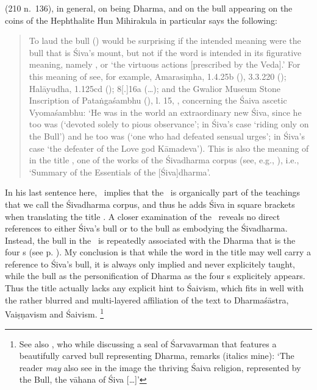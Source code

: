 \documentclass[11pt]{book}
\begin{document}
 (210 n.~136), in general,
on  being Dharma, and
on the bull appearing on the coins of the 
Hephthalite Hun Mihirakula in particular says the following: 

\begin{quote}
{\footnotesize
To laud the bull () 
would be surprising if the intended meaning were 
the bull that is Śiva's mount, but not if the word is intended in its figurative meaning, namely , 
or  `the virtuous actions [prescribed by
the Veda].' For this meaning of  see, for example,
Amarasiṃha,  
1.4.25b (),
3.3.220 (); 
Halāyudha,
 1.125cd (); 
 8[.]16a
(\dots); 
and the Gwalior Museum Stone
Inscription of Pataṅgaśambhu (), l. 15,
, 
concerning the Śaiva ascetic Vyomaśambhu: 
`He was in the
world an extraordinary new Śiva, since he too was 
(`devoted solely to pious observance'; 
in Śiva's case `riding only on the Bull') and he too was 
 (`one who had defeated sensual
urges'; in Śiva's case `the defeater of the Love god Kāmadeva'). 
This is also the meaning of  in the title \Vss,
one of the works of the Śivadharma corpus 
(see, e.g., ), i.e., 
`Summary of the Essentials of the [Śiva]dharma'. 
}
\end{quote}

\noindent
In his last sentence here, \Sanderson\ implies that the
\Vss\ is organically part of the teachings that we call
the Śivadharma corpus, and thus he adds Śiva in
square brackets when translating the title 
\Vss. A closer examination of the \VSS\ 
reveals no direct references to either Śiva's bull or
to the bull as embodying the Śivadharma. Instead, the bull
in the \VSS\ is repeatedly associated with the Dharma that
is the four \asrama s (see p. \pageref{bullasfourasramas}).
My conclusion is that while the word  in the
title may well carry a reference to Śiva's bull, it is always
only implied and never explicitely taught, while the bull as
the personification of Dharma as the four
\asrama s explicitely appears. Thus
the title actually lacks any explicit hint to Śaivism, which
fits in well with the rather blurred and multi-layered 
affiliation of the text to Dharmaśāstra, Vaiṣṇavism and Śaivism.%
		\footnote{See also , who 
			while discussing a seal of Śarvavarman that 
			features a beautifully carved bull representing Dharma,
			remarks (italics mine): `The reader \textit{may} also see in the 
			image the thriving Śaiva religion, represented
			by the Bull, the vāhana of Śiva [\dots]'} 
\end{document}
